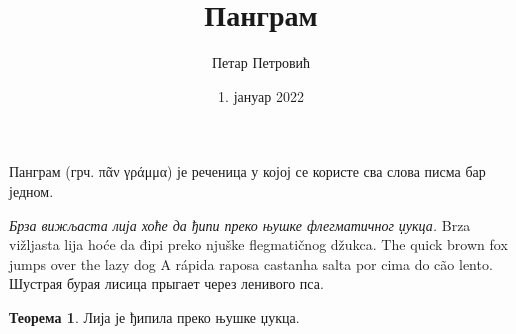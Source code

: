 \documentclass[11pt]{article}
\author{Петар Петровић}
\title{Панграм}
\date{1. јануар 2022}
\theoremstyle{definition}
\newtheorem{teorema}{Теорема}
\begin{document}
\maketitle

Панграм (грч. πᾶν γράμμα) је реченица у којој се користе сва слова писма бар једном. 

\emph{Брза вижљаста лија хоће да ђипи преко њушке флегматичног џукца.}
Brza vižljasta lija hoće da đipi preko njuške flegmatičnog džukca.
The quick brown fox jumps over the lazy dog
A rápida raposa castanha salta por cima do cão lento.
Шустрая бурая лисица прыгает через ленивого пса.

\begin{teorema}
Лија је ђипила преко њушке џукца.
\end{teorema}
\end{document}
